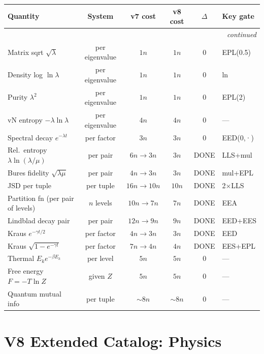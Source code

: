 \documentclass[11pt]{article}
\begin{document}
\begin{longtable}{lccccl}
\toprule
Quantity & System & v7 cost & v8 cost & $\Delta$ & Key gate \\
\midrule
\endhead
\midrule
\multicolumn{6}{r}{\textit{continued}} \\
\endfoot
\bottomrule
\endlastfoot
Matrix sqrt $\sqrt{\lambda}$ & per eigenvalue & $1n$ & $1n$ & $0$ & EPL(0.5) \\
Density log $\ln\lambda$ & per eigenvalue & $1n$ & $1n$ & $0$ & ln \\
Purity $\lambda^2$ & per eigenvalue & $1n$ & $1n$ & $0$ & EPL(2) \\
vN entropy $-\lambda\ln\lambda$ & per eigenvalue & $4n$ & $4n$ & $0$ & --- \\
Spectral decay $e^{-\lambda t}$ & per factor & $3n$ & $3n$ & $0$ & EED(0,·) \\
Rel.\ entropy $\lambda\ln(\lambda/\mu)$ & per pair & $6n\to3n$ & $3n$ & DONE & LLS+mul \\
Bures fidelity $\sqrt{\lambda\mu}$ & per pair & $4n\to3n$ & $3n$ & DONE & mul+EPL \\
JSD per tuple & per tuple & $16n\to10n$ & $10n$ & DONE & 2×LLS \\
Partition fn (per pair of levels) & $n$ levels & $10n\to7n$ & $7n$ & DONE & EEA \\
Lindblad decay pair & per pair & $12n\to9n$ & $9n$ & DONE & EED+EES \\
Kraus $e^{-\gamma t/2}$ & per factor & $4n\to3n$ & $3n$ & DONE & EED \\
Kraus $\sqrt{1-e^{-\gamma t}}$ & per factor & $7n\to4n$ & $4n$ & DONE & EES+EPL \\
Thermal $E_k e^{-\beta E_k}$ & per level & $5n$ & $5n$ & $0$ & --- \\
Free energy $F=-T\ln Z$ & given $Z$ & $5n$ & $5n$ & $0$ & --- \\
Quantum mutual info & per tuple & $\sim8n$ & $\sim8n$ & $0$ & --- \\
\end{longtable}

\section{V8 Extended Catalog: Physics}
\end{document}
